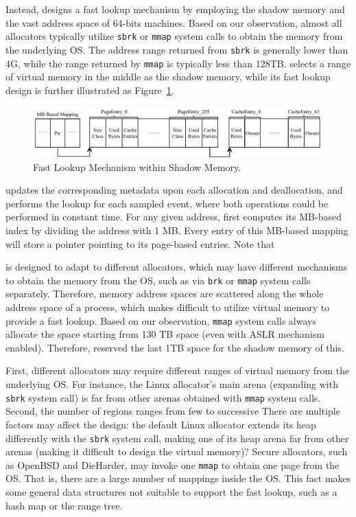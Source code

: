 Instead, \MP{} designs a fast lookup mechanism by employing the shadow memory and the vast address space of 64-bits machines. Based on our observation, almost all allocators typically utilize \texttt{sbrk} or \texttt{mmap} system calls to obtain the memory from the underlying OS. The address range returned from \texttt{sbrk} is generally lower than 4G, while the range returned by \texttt{mmap} is typically less than 128TB. 
\MP{} selects a range of virtual memory in the middle as the shadow memory, while its fast lookup design is further illustrated as Figure~\ref{fig:lookup}. 
          
\begin{figure}[!ht]
\centering
\includegraphics[width=6.3in]{figures/lookup}
\caption{Fast Lookup Mechanism within Shadow Memory.\label{fig:lookup}}
\end{figure}

\MP{} updates the corresponding metadata upon each allocation and deallocation, and performs the lookup for each sampled event, where both operations could be performed in constant time. For any given address, \MP{} first computes its MB-based index by dividing the address with 1 MB. Every entry of this MB-based mapping will store a pointer pointing to its page-based entries. 
Note that    

\MP{} is designed to adapt to different allocators, which may have different mechanisms to obtain the memory from the OS, such as via \texttt{brk} or \texttt{mmap} system calls separately. Therefore, memory address spaces are scattered along the whole address space of a process, which makes difficult to utilize virtual memory to provide a fast lookup. Based on our observation, \texttt{mmap} system calls always allocate the space starting from 130 TB space (even with ASLR mechanism enabled). Therefore, \MP{} reserved the last 1TB space for the shadow memory of this.   

First, different allocators may require different ranges of virtual memory from the underlying OS. For instance, the Linux allocator's main arena (expanding with \texttt{sbrk} system call) is far from other arenas obtained with \texttt{mmap} system calls. Second, the number of regions ranges from few to successive   
There are multiple factors may affect the design: the default Linux allocator extends its heap differently with the \texttt{sbrk} system call, making one of its heap arena far from other arenas (making it difficult to design the virtual memory)? Secure allocators, such as OpenBSD and DieHarder, may invoke one \texttt{mmap} to obtain one page from the OS. That is, there are a large number of mappings inside the OS. This fact makes some general data structures not suitable to support the fast lookup, such as a hash map or the range tree.
